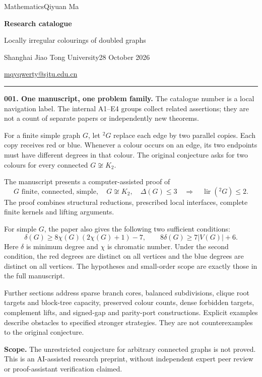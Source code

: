 \documentclass[11pt,a4paper]{article}
\newcommand{\lir}{\operatorname{lir}}
\newcommand{\entry}[2]{\par\vspace{4pt}{\large\bfseries #1}\par #2\par}
\begin{document}
\thispagestyle{plain}
{\small\rmfamily Mathematics\hfill Qiyuan Ma}\par
{\LARGE\bfseries Research catalogue}\par
{\large Locally irregular colourings of doubled graphs}\par
Shanghai Jiao Tong University\hfill 28 October 2026\par
\href{mailto:mqyqwerty@sjtu.edu.cn}{mqyqwerty@sjtu.edu.cn}\par
\hrule\vspace{7pt}
\textbf{001. One manuscript, one problem family.}
The catalogue number is a local navigation label. The internal A1--E4
groups collect related assertions; they are not a count of separate papers
or independently new theorems.

\entry{The problem}{For a finite simple graph $G$, let ${}^{2}G$ replace each
edge by two parallel copies. Each copy receives red or blue. Whenever a
colour occurs on an edge, its two endpoints must have different degrees
in that colour. The original conjecture asks for two colours for every
connected $G\not\cong K_2$.}

\entry{Principal result: the subcubic case}{The manuscript presents a
computer-assisted proof of
\[
 G\text{ finite, connected, simple},\quad G\not\cong K_2,\quad
 \Delta(G)\le3\quad\Longrightarrow\quad\lir({}^{2}G)\le2.
\]
The proof combines structural reductions, prescribed local interfaces,
complete finite kernels and lifting arguments.}

\entry{Further sufficient conditions}{For simple $G$, the paper also gives
the following two sufficient conditions:
\[
 \delta(G)\ge8\chi(G)(2\chi(G)+1)-7,
 \qquad 8\delta(G)\ge7|V(G)|+6.
\]
Here $\delta$ is minimum degree and $\chi$ is chromatic number. Under the
second condition, the red degrees are distinct on all vertices and the
blue degrees are distinct on all vertices. The hypotheses and small-order
scope are exactly those in the full manuscript.}

\entry{Constructions and interfaces}{Further sections address sparse
branch cores, balanced subdivisions, clique root targets and block-tree
capacity, preserved colour counts, dense forbidden targets, complement
lifts, and signed-gap and parity-port constructions. Explicit examples
describe obstacles to specified stronger strategies. They are not
counterexamples to the original conjecture.}

\textbf{Scope.} The unrestricted conjecture for arbitrary connected
graphs is not proved. This is an AI-assisted research preprint, without
independent expert peer review or proof-assistant verification claimed.
\clearpage
\end{document}
